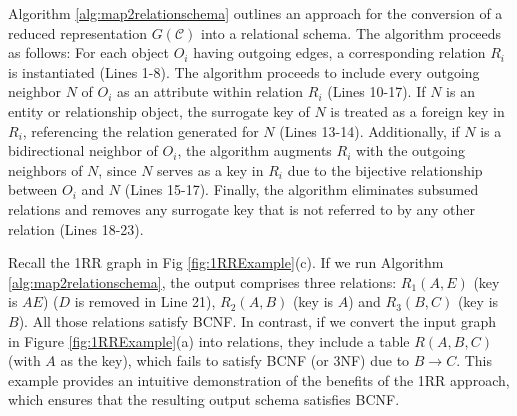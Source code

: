 Algorithm \ref{alg:map2relationschema} outlines an approach for the conversion of a reduced representation $G(\mathcal{C})$ into a relational schema.  The algorithm proceeds as follows: For each object $O_i$ having outgoing edges, a corresponding relation $R_i$ is instantiated (Lines 1-8).  The algorithm proceeds to include every outgoing neighbor $N$ of $O_i$ as an attribute within relation $R_i$ (Lines 10-17). If $N$ is an entity or relationship object, the surrogate key of $N$ is treated as a foreign key in $R_i$, referencing the relation generated for $N$ (Lines 13-14). Additionally, if $N$ is a bidirectional neighbor of $O_i$, the algorithm augments $R_i$ with the outgoing neighbors of $N$, since $N$  serves as a key in $R_i$ due to the bijective relationship between $O_i$ and $N$ (Lines 15-17). Finally, the algorithm eliminates subsumed relations and removes any surrogate key that is not referred to by any other relation (Lines 18-23). 





\begin{example} Recall the 1RR graph in Fig \ref{fig:1RRExample}(c). If we run Algorithm \ref{alg:map2relationschema}, the output comprises three relations:  $R_1(A,E)$  (key is $AE$) ($D$ is removed in Line 21), $R_2(A,B)$  (key is $A$) and $R_3(B,C)$  (key is $B$). All those relations satisfy  BCNF. In contrast, if we convert the input graph in Figure \ref{fig:1RRExample}(a) into relations, they include a table $R(A,B,C)$ (with $A$ as the key), which fails to satisfy BCNF (or 3NF) due to $B \to C$.  This example provides an intuitive demonstration of the benefits of the 1RR approach, which ensures that the resulting output schema satisfies BCNF. 

\end{example}


